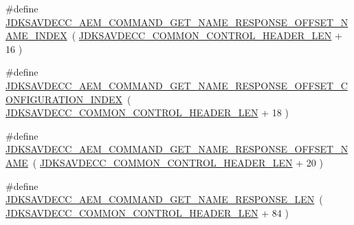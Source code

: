 \begin{DoxyCompactItemize}
\item 
\#define \hyperlink{group__command__get__name__response_ga40d9451ac98ec41c2797566fb3326f7f}{J\+D\+K\+S\+A\+V\+D\+E\+C\+C\+\_\+\+A\+E\+M\+\_\+\+C\+O\+M\+M\+A\+N\+D\+\_\+\+G\+E\+T\+\_\+\+N\+A\+M\+E\+\_\+\+R\+E\+S\+P\+O\+N\+S\+E\+\_\+\+O\+F\+F\+S\+E\+T\+\_\+\+N\+A\+M\+E\+\_\+\+I\+N\+D\+EX}~( \hyperlink{group__jdksavdecc__avtp__common__control__header_gaae84052886fb1bb42f3bc5f85b741dff}{J\+D\+K\+S\+A\+V\+D\+E\+C\+C\+\_\+\+C\+O\+M\+M\+O\+N\+\_\+\+C\+O\+N\+T\+R\+O\+L\+\_\+\+H\+E\+A\+D\+E\+R\+\_\+\+L\+EN} + 16 )
\item 
\#define \hyperlink{group__command__get__name__response_gaf96b46923385d39208f35e8ef9a5c752}{J\+D\+K\+S\+A\+V\+D\+E\+C\+C\+\_\+\+A\+E\+M\+\_\+\+C\+O\+M\+M\+A\+N\+D\+\_\+\+G\+E\+T\+\_\+\+N\+A\+M\+E\+\_\+\+R\+E\+S\+P\+O\+N\+S\+E\+\_\+\+O\+F\+F\+S\+E\+T\+\_\+\+C\+O\+N\+F\+I\+G\+U\+R\+A\+T\+I\+O\+N\+\_\+\+I\+N\+D\+EX}~( \hyperlink{group__jdksavdecc__avtp__common__control__header_gaae84052886fb1bb42f3bc5f85b741dff}{J\+D\+K\+S\+A\+V\+D\+E\+C\+C\+\_\+\+C\+O\+M\+M\+O\+N\+\_\+\+C\+O\+N\+T\+R\+O\+L\+\_\+\+H\+E\+A\+D\+E\+R\+\_\+\+L\+EN} + 18 )
\item 
\#define \hyperlink{group__command__get__name__response_ga105f393dfad992bd48e27b55fc8776a0}{J\+D\+K\+S\+A\+V\+D\+E\+C\+C\+\_\+\+A\+E\+M\+\_\+\+C\+O\+M\+M\+A\+N\+D\+\_\+\+G\+E\+T\+\_\+\+N\+A\+M\+E\+\_\+\+R\+E\+S\+P\+O\+N\+S\+E\+\_\+\+O\+F\+F\+S\+E\+T\+\_\+\+N\+A\+ME}~( \hyperlink{group__jdksavdecc__avtp__common__control__header_gaae84052886fb1bb42f3bc5f85b741dff}{J\+D\+K\+S\+A\+V\+D\+E\+C\+C\+\_\+\+C\+O\+M\+M\+O\+N\+\_\+\+C\+O\+N\+T\+R\+O\+L\+\_\+\+H\+E\+A\+D\+E\+R\+\_\+\+L\+EN} + 20 )
\item 
\#define \hyperlink{group__command__get__name__response_ga1b946fd6efd4496498b2ea0c902bb167}{J\+D\+K\+S\+A\+V\+D\+E\+C\+C\+\_\+\+A\+E\+M\+\_\+\+C\+O\+M\+M\+A\+N\+D\+\_\+\+G\+E\+T\+\_\+\+N\+A\+M\+E\+\_\+\+R\+E\+S\+P\+O\+N\+S\+E\+\_\+\+L\+EN}~( \hyperlink{group__jdksavdecc__avtp__common__control__header_gaae84052886fb1bb42f3bc5f85b741dff}{J\+D\+K\+S\+A\+V\+D\+E\+C\+C\+\_\+\+C\+O\+M\+M\+O\+N\+\_\+\+C\+O\+N\+T\+R\+O\+L\+\_\+\+H\+E\+A\+D\+E\+R\+\_\+\+L\+EN} + 84 )
\end{DoxyCompactItemize}
